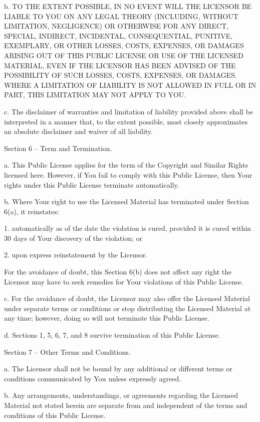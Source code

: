   b. TO THE EXTENT POSSIBLE, IN NO EVENT WILL THE LICENSOR BE LIABLE
     TO YOU ON ANY LEGAL THEORY (INCLUDING, WITHOUT LIMITATION,
     NEGLIGENCE) OR OTHERWISE FOR ANY DIRECT, SPECIAL, INDIRECT,
     INCIDENTAL, CONSEQUENTIAL, PUNITIVE, EXEMPLARY, OR OTHER LOSSES,
     COSTS, EXPENSES, OR DAMAGES ARISING OUT OF THIS PUBLIC LICENSE OR
     USE OF THE LICENSED MATERIAL, EVEN IF THE LICENSOR HAS BEEN
     ADVISED OF THE POSSIBILITY OF SUCH LOSSES, COSTS, EXPENSES, OR
     DAMAGES. WHERE A LIMITATION OF LIABILITY IS NOT ALLOWED IN FULL OR
     IN PART, THIS LIMITATION MAY NOT APPLY TO YOU.

  c. The disclaimer of warranties and limitation of liability provided
     above shall be interpreted in a manner that, to the extent
     possible, most closely approximates an absolute disclaimer and
     waiver of all liability.


Section 6 -- Term and Termination.

  a. This Public License applies for the term of the Copyright and
     Similar Rights licensed here. However, if You fail to comply with
     this Public License, then Your rights under this Public License
     terminate automatically.

  b. Where Your right to use the Licensed Material has terminated under
     Section 6(a), it reinstates:

       1. automatically as of the date the violation is cured, provided
          it is cured within 30 days of Your discovery of the
          violation; or

       2. upon express reinstatement by the Licensor.

     For the avoidance of doubt, this Section 6(b) does not affect any
     right the Licensor may have to seek remedies for Your violations
     of this Public License.

  c. For the avoidance of doubt, the Licensor may also offer the
     Licensed Material under separate terms or conditions or stop
     distributing the Licensed Material at any time; however, doing so
     will not terminate this Public License.

  d. Sections 1, 5, 6, 7, and 8 survive termination of this Public
     License.


Section 7 -- Other Terms and Conditions.

  a. The Licensor shall not be bound by any additional or different
     terms or conditions communicated by You unless expressly agreed.

  b. Any arrangements, understandings, or agreements regarding the
     Licensed Material not stated herein are separate from and
     independent of the terms and conditions of this Public License.


